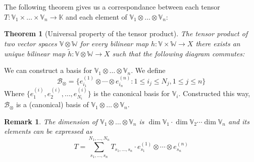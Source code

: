 \documentclass[11pt,a4paper,openright,oneside]{book}
\numberwithin{equation}{section}
\newtheorem{thm0}[defn0]{Theorem}
\newtheorem{remark0}[defn0]{Remark}
\newenvironment{theorem}{\bigskip \begin{thm0}}{\end{thm0}}
\newenvironment{remark}{ \begin{remark0}\rm}{\end{remark0}}
\begin{document}
The following theorem gives us a correspondance between each tensor ${T: \mathbb{V}_1 \times \dots \times \mathbb{V}_n \rightarrow \mathbb{K}}$
and each element of $\mathbb{V}_1 \otimes \dots \otimes \mathbb{V}_n$:

\begin{theorem}[Universal property of the tensor product]
    The tensor product of two vector spaces $\mathbb{V} \otimes \mathbb{W}$
    for every bilinear map $h: \mathbb{V} \times \mathbb{W} \rightarrow X$ there exists an unique bilinear map $\tilde{h}: \mathbb{V} \otimes
    \mathbb{W} \rightarrow X$ such that the following diagram commutes:

    \centering

\end{theorem}

We can construct a basis for $\mathbb{V}_1 \otimes \dots \otimes \mathbb{V}_n$. We define
$$\mathcal{B}_{\otimes} = \{e_{i_1}^{(1)} \otimes \cdots \otimes e_{i_n}^{(n)} : 1 \leqslant i_j \leqslant N_j, 1 \leqslant j \leqslant n\}$$
Where $\{e_1^{(i)}, e_2^{(i)}, \dots, e_{N_i}^{(i)}\}$ is the canonical basis for $\mathbb{V}_i$.
Constructed this way, $\mathcal{B}_\otimes$ is a (canonical) basis of ${\mathbb{V}_1 \otimes \dots \otimes \mathbb{V}_n}$.

\begin{remark} \label{rem:tenbase} The dimension
    of ${\mathbb{V}_1 \otimes \dots \otimes \mathbb{V}_n}$ is ${\dim{\mathbb{V}_1} \cdot \dim{\mathbb{V}_2} \cdots \dim{\mathbb{V}_n}}$ and its elements can be expressed as
    \begin{equation} \label{eq:base-representation}
T = \sum_{s_1, \dots, s_n}^{N_1, \dots, N_n} T_{s_1, \dots, s_n} \cdot  e_{s_1}^{(1)} \otimes \cdots \otimes e_{s_n}^{(n)}
\end{equation}
\end{remark}
\end{document}
